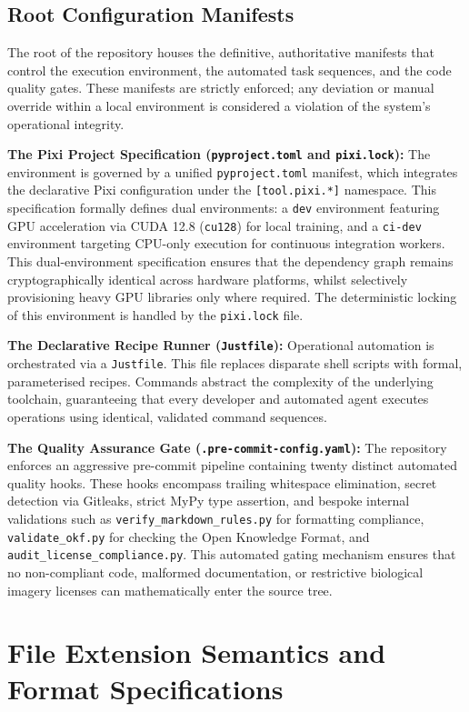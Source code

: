 \subsection{Root Configuration Manifests}
The root of the repository houses the definitive, authoritative manifests that control the execution environment, the automated task sequences, and the code quality gates. These manifests are strictly enforced; any deviation or manual override within a local environment is considered a violation of the system's operational integrity.

\textbf{The Pixi Project Specification (\texttt{pyproject.toml} and \texttt{pixi.lock}):} The environment is governed by a unified \texttt{pyproject.toml} manifest, which integrates the declarative Pixi configuration under the \texttt{[tool.pixi.*]} namespace. This specification formally defines dual environments: a \texttt{dev} environment featuring GPU acceleration via CUDA 12.8 (\texttt{cu128}) for local training, and a \texttt{ci-dev} environment targeting CPU-only execution for continuous integration workers. This dual-environment specification ensures that the dependency graph remains cryptographically identical across hardware platforms, whilst selectively provisioning heavy GPU libraries only where required. The deterministic locking of this environment is handled by the \texttt{pixi.lock} file.

\textbf{The Declarative Recipe Runner (\texttt{Justfile}):} Operational automation is orchestrated via a \texttt{Justfile}. This file replaces disparate shell scripts with formal, parameterised recipes. Commands abstract the complexity of the underlying toolchain, guaranteeing that every developer and automated agent executes operations using identical, validated command sequences.

\textbf{The Quality Assurance Gate (\texttt{.pre-commit-config.yaml}):} The repository enforces an aggressive pre-commit pipeline containing twenty distinct automated quality hooks. These hooks encompass trailing whitespace elimination, secret detection via Gitleaks, strict MyPy type assertion, and bespoke internal validations such as \texttt{verify\_markdown\_rules.py} for formatting compliance, \texttt{validate\_okf.py} for checking the Open Knowledge Format, and \texttt{audit\_license\_compliance.py}. This automated gating mechanism ensures that no non-compliant code, malformed documentation, or restrictive biological imagery licenses can mathematically enter the source tree.

\section{File Extension Semantics and Format Specifications}
\label{sec:file_extension_semantics}

